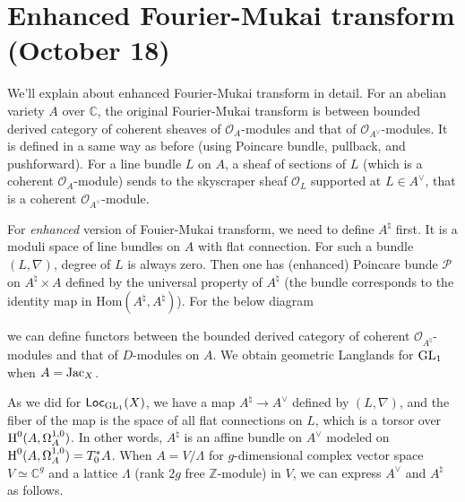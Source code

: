 \newpage
\section{Enhanced Fourier-Mukai transform (October 18)}

We'll explain about enhanced Fourier-Mukai transform in detail.
For an abelian variety $A$ over $\mathbb{C}$, the original Fourier-Mukai transform is between 
bounded derived category of coherent sheaves of $\mathcal{O}_A$-modules and that of $\mathcal{O}_{A^\vee}$-modules.
It is defined in a same way as before (using Poincare bundle, pullback, and pushforward).
For a line bundle $L$ on $A$, a sheaf of sections of $L$ (which is a coherent $\mathcal{O}_A$-module)
sends to the skyscraper sheaf $\mathcal{O}_L$ supported at $L \in A^\vee$, that is a coherent
$\mathcal{O}_{A^\vee}$-module.

For \emph{enhanced} version of Fouier-Mukai transform, we need to define $A^\natural$ first.
It is a moduli space of line bundles on $A$ with flat connection. 
For such a bundle $(L, \nabla)$, degree of $L$ is always zero.
Then one has (enhanced) Poincare bunde $\mathcal{P}$ on $A^\natural \times A$
defined by the universal property of $A^\natural$ (the bundle corresponds to the identity map in $\mathrm{Hom}(A^\natural, A^\natural)$).
For the below diagram
\begin{center}
\end{center}
we can define functors between the bounded derived category of coherent $\mathcal{O}_{A^\natural}$-modules and  
that of $D$-modules on $A$.
We obtain geometric Langlands for $\operatorname{\mathrm{GL}}_1$ when $A = \operatorname{\mathrm{Jac}}_X$.

As we did for $\operatorname{\mathsf{Loc}}_{\operatorname{\mathrm{GL}}_1}(X)$, we have a map $A^\natural \to A^\vee$ defined by $(L, \nabla)$, 
and the fiber of the map is the space of all flat connections on $L$, which is a torsor over $\operatorname{\mathrm{H}}^0(A, \Omega_A^{1, 0})$.
In other words, $A^\natural$ is an affine bundle on $A^\vee$ modeled on $\operatorname{\mathrm{H}}^0(A, \Omega_A^{1, 0}) = T_{0}^*A$.
When $A = V /\Lambda$ for $g$-dimensional complex vector space $V \simeq \mathbb{C}^g$ and a lattice
$\Lambda$ (rank $2g$ free $\mathbb{Z}$-module) in $V$, we can express $A^\vee$ and $A^\natural$ as follows.

